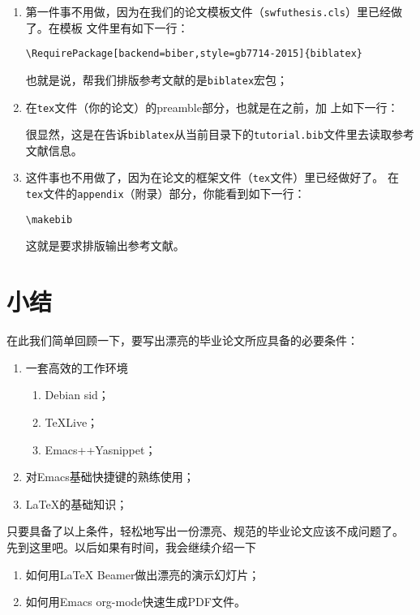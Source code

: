 \begin{enumerate}
\item 第一件事不用做，因为在我们的论文模板文件（\texttt{swfuthesis.cls}）里已经做了。在模板
  文件里有如下一行：\par            \hspace{4em}\verb|\RequirePackage[backend=biber,style=gb7714-2015]{biblatex}|\par
  也就是说，帮我们排版参考文献的是\texttt{biblatex}宏包；
\item 在\texttt{tex}文件（你的论文）的preamble部分，也就是在\verb||之前，加
    上如下一行：\par\hspace{4em}\verb||\par
    很显然，这是在告诉\texttt{biblatex}从当前目录下的\texttt{tutorial.bib}文件里去读取参考
    文献信息。
  \item 这件事也不用做了，因为在论文的框架文件（\texttt{tex}文件）里已经做好了。
    在\texttt{tex}文件的\texttt{appendix}（附录）部分，你能看到如下一行：\par
    \hspace{4em}\verb|\makebib|\par{}这就是要求排版输出参考文献。
  \end{enumerate}

\section{小结}

在此我们简单回顾一下，要写出漂亮的毕业论文所应具备的必要条件：

\begin{enumerate}
\item 一套高效的工作环境
  \begin{enumerate}
  \item Debian sid；
  \item \TeX{}Live；
  \item Emacs+\auctex{}+Yasnippet；
  \end{enumerate}
\item 对Emacs基础快捷键的熟练使用；
\item \LaTeX{}的基础知识；
\end{enumerate}

只要具备了以上条件，轻松地写出一份漂亮、规范的毕业论文应该不成问题了。
先到这里吧。以后如果有时间，我会继续介绍一下

\begin{enumerate}
\item 如何用\LaTeX{} Beamer做出漂亮的演示幻灯片；
\item 如何用Emacs org-mode快速生成PDF文件。
\end{enumerate}

